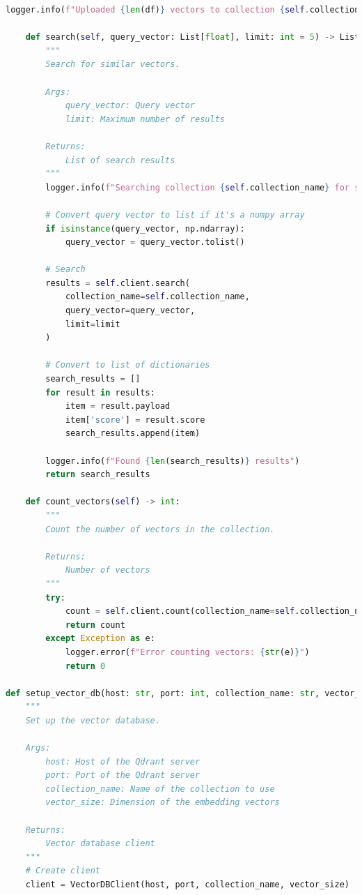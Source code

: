 \documentclass[
  screen,review,acmlarge]{acmart}
\begin{document}
\begin{lstlisting}[language=Python]
        logger.info(f"Uploaded {len(df)} vectors to collection {self.collection_name}")
    
    def search(self, query_vector: List[float], limit: int = 5) -> List[Dict]:
        """
        Search for similar vectors.
        
        Args:
            query_vector: Query vector
            limit: Maximum number of results
            
        Returns:
            List of search results
        """
        logger.info(f"Searching collection {self.collection_name} for similar vectors")
        
        # Convert query vector to list if it's a numpy array
        if isinstance(query_vector, np.ndarray):
            query_vector = query_vector.tolist()
        
        # Search
        results = self.client.search(
            collection_name=self.collection_name,
            query_vector=query_vector,
            limit=limit
        )
        
        # Convert to list of dictionaries
        search_results = []
        for result in results:
            item = result.payload
            item['score'] = result.score
            search_results.append(item)
        
        logger.info(f"Found {len(search_results)} results")
        return search_results
    
    def count_vectors(self) -> int:
        """
        Count the number of vectors in the collection.
        
        Returns:
            Number of vectors
        """
        try:
            count = self.client.count(collection_name=self.collection_name).count
            return count
        except Exception as e:
            logger.error(f"Error counting vectors: {str(e)}")
            return 0

def setup_vector_db(host: str, port: int, collection_name: str, vector_size: int) -> VectorDBClient:
    """
    Set up the vector database.
    
    Args:
        host: Host of the Qdrant server
        port: Port of the Qdrant server
        collection_name: Name of the collection to use
        vector_size: Dimension of the embedding vectors
        
    Returns:
        Vector database client
    """
    # Create client
    client = VectorDBClient(host, port, collection_name, vector_size)
    

\end{lstlisting}
\end{document}
